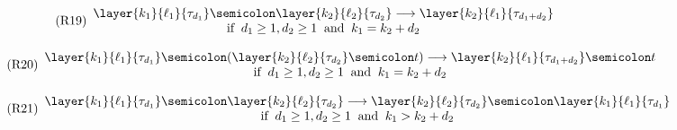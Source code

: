 \begin{figure}[t]
{\begin{minipage}{0.982\linewidth}
\begin{center}
        \vspace{-0.5em}
        \hspace{-0.8em}
        \begin{subfigure}{0.55\textwidth}
            \begin{equation}\label{ru:swap:layerfus}\tag{R19}
                \begin{array}{c}
                    \layer{k_1}{\ell_1}{\tau_{d_1}}\semicolon\layer{k_2}{\ell_2}{\tau_{d_2}} \longrightarrow \layer{k_2}{\ell_1}{\tau_{d_1+d_2}} \\
                    \text{if}\;\; d_1\ge1,d_2\ge1 \;\;\text{and}\;\; k_1=k_2+d_2
                \end{array}
            \end{equation}
        \end{subfigure}

        \vspace{-0.5em}
        \hspace{-0.8em}
        \begin{subfigure}{0.63\textwidth}
            \begin{equation}\label{ru:swap:layerfusctx}\tag{R20}
                \begin{array}{c}
                    \layer{k_1}{\ell_1}{\tau_{d_1}}\semicolon (\layer{k_2}{\ell_2}{\tau_{d_2}}\semicolon t) \longrightarrow \layer{k_2}{\ell_1}{\tau_{d_1+d_2}}\semicolon t \\
                    \text{if}\;\; d_1\ge1,d_2\ge1 \;\;\text{and}\;\; k_1=k_2+d_2
                \end{array}
            \end{equation}
        \end{subfigure}

        \vspace{-0.5em}
        \hspace{-0.8em}
        \begin{subfigure}{0.63\textwidth}
            \begin{equation}\label{ru:swap:layercom}\tag{R21}
                \begin{array}{c}
                    \layer{k_1}{\ell_1}{\tau_{d_1}}\semicolon\layer{k_2}{\ell_2}{\tau_{d_2}} \longrightarrow \layer{k_2}{\ell_2}{\tau_{d_2}}\semicolon \layer{k_1}{\ell_1}{\tau_{d_1}} \\
                    \text{if}\;\; d_1\ge1,d_2\ge1 \;\;\text{and}\;\; k_1>k_2+d_2
                \end{array}
            \end{equation}
        \end{subfigure}


\end{center}
\end{minipage}}
\end{figure}

